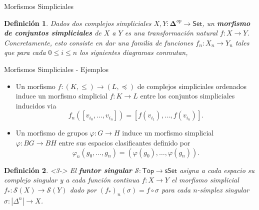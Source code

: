 \documentclass[11pt]{beamer}
\newcommand{\cat}[1]{\mathsf{#1}}
\renewcommand{\ss}[1]{\Delta^{#1}}
\newcommand{\ordcat}{\boldsymbol{\Delta}}
\newtheorem{defs}{Definición}
\begin{document}
\begin{frame}{Morfismos Simpliciales}

\begin{defs} Dados dos complejos simpliciales $X,Y : \ordcat^{op} \to \cat{Set}$, un \textbf{morfismo de conjuntos simpliciales} de $X$ a $Y$ es una transformación natural $f : X \to Y$. Concretamente, esto consiste en dar una familia de funciones $f_n : X_n \to Y_n$ tales que para cada $0 \leq i \leq n$  los siguientes diagramas conmutan,
\begin{center}
\end{center}
\end{defs}
\end{frame}

\begin{frame}{Morfismos Simpliciales - Ejemplos}
\begin{itemize}
\item <1-> Un morfismo $f \colon (K,\leq) \to (L,\preceq)$ de complejos simpliciales ordenados induce un morfismo simplicial $f : K \to L$ entre los conjuntos simpliciales inducidos via
\[
f_n([v_{i_0}, \dots, v_{i_n}]) = [f(v_{i_1}), \dots, f(v_{i_n})].
\]
\item <2-> Un morfismo de grupos $\varphi : G \to H$ induce un morfismo simplicial $\varphi : BG \to BH$ entre sus espacios clasificantes definido por
\[
\varphi_n(g_0, \dots,g_n) = (\varphi(g_0),\dots,\varphi(g_n)).
\]
\end{itemize}
\begin{defs} <3-> El \textbf{funtor singular} $\mathscr{S} : \cat{Top} \to \cat{sSet}$ asigna a cada espacio su complejo singular y a cada función continua $f : X \to Y$ el morfismo simplicial $f_* : \mathscr{S}(X) \to \mathscr{S}(Y)$ dado por $(f_*)_n(\sigma) =  f \circ \sigma$ para cada $n$-símplex singular $\sigma: |\ss{n}| \to X$.
\end{defs}
\end{frame}
\end{document}

